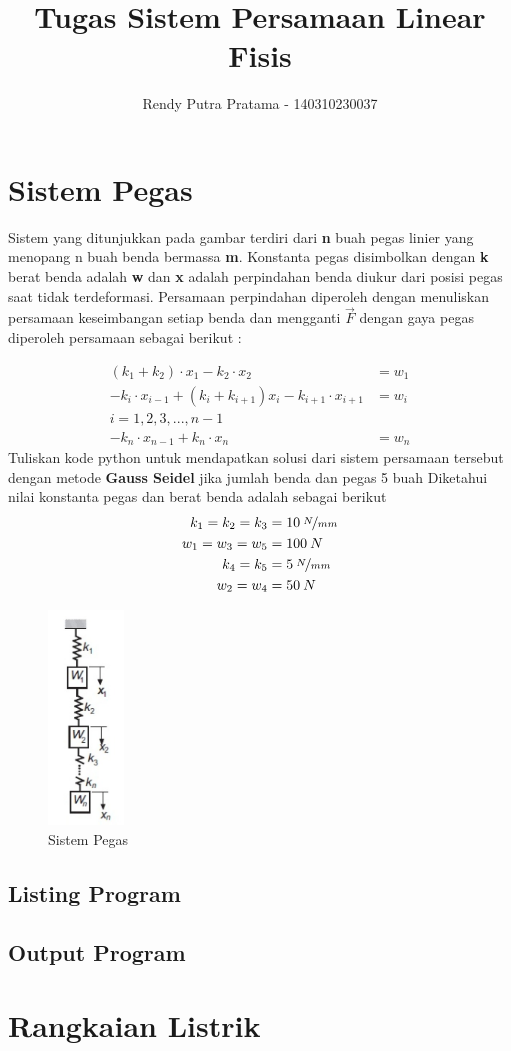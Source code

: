 \documentclass[a4paper]{article}
\author{Rendy Putra Pratama - 140310230037}
\title{Tugas Sistem Persamaan Linear Fisis}
\date{}
\begin{document}
\maketitle
\section{Sistem Pegas}
Sistem
yang ditunjukkan pada gambar terdiri dari \textbf{n} buah pegas linier yang menopang n
buah benda bermassa \textbf{m}. Konstanta pegas disimbolkan dengan \textbf{k} berat benda adalah
\textbf{w} dan \textbf{x} adalah perpindahan benda diukur dari posisi pegas saat tidak terdeformasi.
Persamaan perpindahan diperoleh dengan menuliskan persamaan keseimbangan
setiap benda dan mengganti $\vec{F}$ dengan gaya pegas diperoleh persamaan sebagai
berikut $:$

\begin{align*}
(k_1 + k_2)\cdot x_1 - k_2 \cdot x_2 &= w_1 \\
-k_i\cdot x_{i-1} + (k_i+k_{i+1})x_i - k_{i+1}\cdot x_{i+1} &= w_i\\
i = 1,2,3,..., n-1\\
-k_n\cdot x_{n-1}+k_n \cdot x_n &= w_n
\end{align*}
Tuliskan
kode python untuk mendapatkan solusi dari sistem persamaan tersebut
dengan metode \textbf{Gauss Seidel} jika jumlah benda dan pegas 5 buah Diketahui nilai
konstanta pegas dan berat benda adalah sebagai berikut
\begin{align*}
k_1 = k_2 = k_3 &= 10\> \nicefrac{N}{mm} \\
w_1 = w_3 = w_5 &= 100 \> N \\
k_4 = k_5 &= 5 \> \nicefrac{N}{mm} \\ 
w_2 = w_4 &= 50 \> N
\end{align*}
\begin{figure}[h!]
\centering
\includegraphics[width=2cm]{splpgs.jpeg}
\caption{Sistem Pegas}
\label{fig: Angular Position}
\end{figure}
\newpage
\subsection{Listing Program}

\subsection{Output Program}
\section{Rangkaian Listrik}
\end{document}
